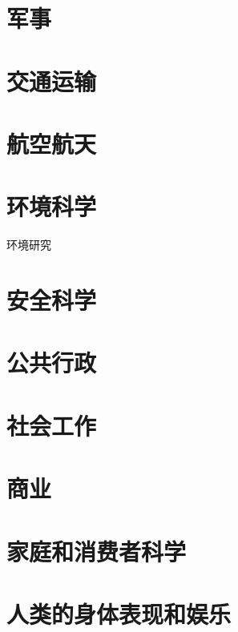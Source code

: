 \documentclass[UTF8]{ApplicationUniverse}
\begin{document}
\chapter{军事} %



\chapter{交通运输} %


\chapter{航空航天} %


\chapter{环境科学} %
环境研究

\chapter{安全科学} %







\chapter{公共行政}

\chapter{社会工作}

\chapter{商业}

\chapter{家庭和消费者科学}



\chapter{人类的身体表现和娱乐}
\end{document}
